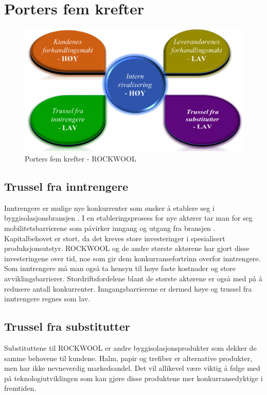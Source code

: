 \section{Porters fem krefter}
\begin{figure}[H]
\centering
\includegraphics [scale=0.5]{bilder/portersFemKrefter.png}
\caption{Porters fem krefter - ROCKWOOL}
\label{fig:portersFemKrefter}
\end{figure}

\subsection{Trussel fra inntrengere}
Inntrengere er mulige nye konkurrenter som ønsker å etablere seg i byggisolasjonsbransjen \cite[s.~94]{FjeldstadogLunnan2018}. I en etableringsprosess for nye aktører tar man for seg mobilitetsbarrierene som påvirker inngang og utgang fra bransjen \cite[s.~90]{FjeldstadogLunnan2018}. Kapitalbehovet er stort, da det kreves store investeringer i spesialisert produksjonsutstyr. ROCKWOOL og de andre største aktørene har gjort disse investeringene over tid, noe som gir dem konkurransefortrinn overfor inntrengere. Som inntrengere må man også ta hensyn til høye faste kostnader og store avviklingsbarrierer. Stordriftsfordelene blant de største aktørene er også med på å redusere antall konkurrenter. Inngangsbarrierene er dermed høye og trussel fra inntrengere regnes som lav.

\subsection{Trussel fra substitutter}
Substituttene til ROCKWOOL er andre byggisolasjonsprodukter som dekker de samme behovene til kundene. Halm, papir og trefiber er alternative produkter, men har ikke nevneverdig markedsandel. Det vil allikevel være viktig å følge med på teknologiutviklingen som kan gjøre disse produktene mer konkurransedyktige i fremtiden.

